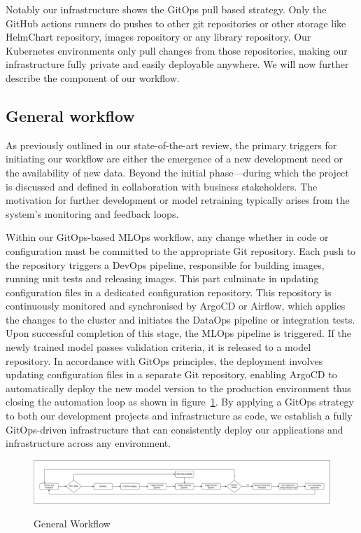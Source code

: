 Notably our infrastructure shows the GitOps pull based strategy.
Only the GitHub actions runners do pushes to other git repositories or other
storage like HelmChart repository, images repository or any library repository.
Our Kubernetes environments only pull changes from those repositories, making our infrastructure fully private and easily deployable anywhere.
We will now further describe the component of our workflow.

\subsection{General workflow}\label{subsec:general-development-workflow}
As previously outlined in our state-of-the-art review, the primary triggers for initiating our workflow are either
the emergence of a new development need or the availability of new data.
Beyond the initial phase—during which the project is discussed and defined in collaboration with business stakeholders.
The motivation for further development or model retraining typically arises from the system's monitoring and feedback loops.

Within our GitOps-based MLOps workflow, any change whether in code or configuration must be committed to the appropriate Git repository.
Each push to the repository triggers a DevOps pipeline, responsible for building images, running unit tests and releasing images.
This part culminate in updating configuration files in a dedicated configuration repository.
This repository is continuously monitored and synchronised by ArgoCD or Airflow, which applies the changes to the cluster and initiates the DataOps pipeline
or integration tests.
Upon successful completion of this stage, the MLOps pipeline is triggered.
If the newly trained model passes validation criteria, it is released to a model repository.
In accordance with GitOps principles, the deployment involves updating configuration files in a separate Git repository,
enabling ArgoCD to automatically deploy the new model version to the production environment thus closing the automation loop
as shown in figure~\ref{fig:general-workflow}.
By applying a GitOps strategy to both our development projects and infrastructure as code,
we establish a fully GitOps-driven infrastructure that can consistently deploy our applications and infrastructure across any environment.

\begin{figure}[!htbp]
    \centering
    \caption{General Workflow}
    \includegraphics[width=\linewidth]{images/project/general_workflow}
    \label{fig:general-workflow}
\end{figure}

